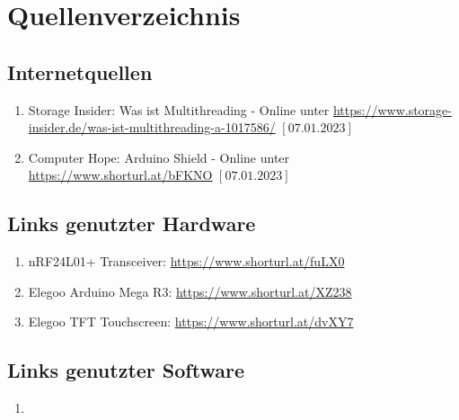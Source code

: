 \documentclass[a4paper, 11pt]{scrartcl}
\begin{document}
\section{Quellenverzeichnis}
\subsection{Internetquellen}
\begin{enumerate}
    \item Storage Insider: Was ist Multithreading - Online unter \url{https://www.storage-insider.de/was-ist-multithreading-a-1017586/} $\left[\text{07.01.2023}\right]$ \label{itm:multithread}
    \item Computer Hope: Arduino Shield - Online unter \url{https://www.shorturl.at/bFKNO} $\left[\text{07.01.2023}\right]$ \label{itm:shield}
\end{enumerate}

\subsection{Links genutzter Hardware}\label{ch:hardwarelinks}
\begin{enumerate}
    \item nRF24L01+ Transceiver: \url{https://www.shorturl.at/fuLX0}\label{itm:transceiverlink}
    \item Elegoo Arduino Mega R3: \url{https://www.shorturl.at/XZ238}\label{itm:arduinolink}
    \item Elegoo TFT Touchscreen: \url{https://www.shorturl.at/dvXY7}\label{itm:tftlink}
\end{enumerate}

\subsection{Links genutzter Software}\label{ch:softwarelinks}
\begin{enumerate}
    \item 
\end{enumerate}
\end{document}
